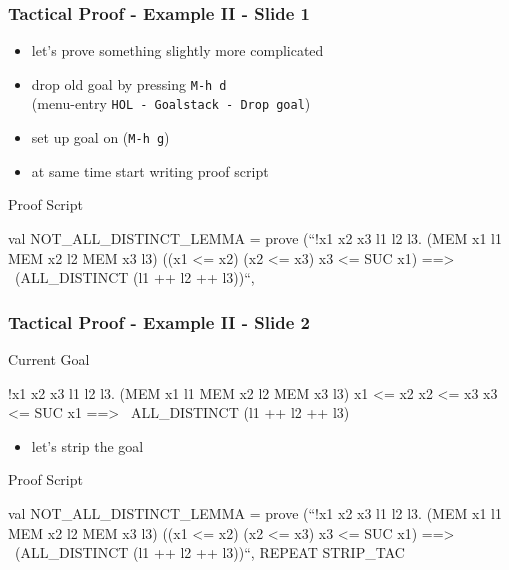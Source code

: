 \begin{frame}[fragile]
\frametitle{Tactical Proof - Example II - Slide 1}

\begin{itemize}
\item let's prove something slightly more complicated
\item drop old goal by pressing \texttt{M-h d}\\
      (menu-entry \texttt{HOL - Goalstack - Drop goal})
\item set up goal on  (\texttt{M-h g})
\item at same time start writing proof script
\end{itemize}

\begin{block}{Proof Script}
\begin{semiverbatim}\small
val NOT_ALL_DISTINCT_LEMMA = prove (``!x1 x2 x3 l1 l2 l3.
  (MEM x1 l1 \holAnd{} MEM x2 l2 \holAnd{} MEM x3 l3) \holAnd{}
  ((x1 <= x2) \holAnd{} (x2 <= x3) \holAnd{} x3 <= SUC x1) ==>
  ~(ALL_DISTINCT (l1 ++ l2 ++ l3))``,
\end{semiverbatim}
\end{block}

\end{frame}




\begin{frame}[fragile]
\frametitle{Tactical Proof - Example II - Slide 2}

\begin{block}{Current Goal}
\begin{semiverbatim}\small
!x1 x2 x3 l1 l2 l3.
  (MEM x1 l1 \holAnd{} MEM x2 l2 \holAnd{} MEM x3 l3) \holAnd{} 
  x1 <= x2 \holAnd{} x2 <= x3 \holAnd{} x3 <= SUC x1 ==>
  ~ALL_DISTINCT (l1 ++ l2 ++ l3)
\end{semiverbatim}
\end{block}


\begin{itemize}
\item let's strip the goal 
\end{itemize}

\begin{block}{Proof Script}
\begin{semiverbatim}\small
val NOT_ALL_DISTINCT_LEMMA = prove (``!x1 x2 x3 l1 l2 l3.
  (MEM x1 l1 \holAnd{} MEM x2 l2 \holAnd{} MEM x3 l3) \holAnd{}
  ((x1 <= x2) \holAnd{} (x2 <= x3) \holAnd{} x3 <= SUC x1) ==>
  ~(ALL_DISTINCT (l1 ++ l2 ++ l3))``,
REPEAT STRIP\_TAC
\end{semiverbatim}
\end{block}
\end{frame}

